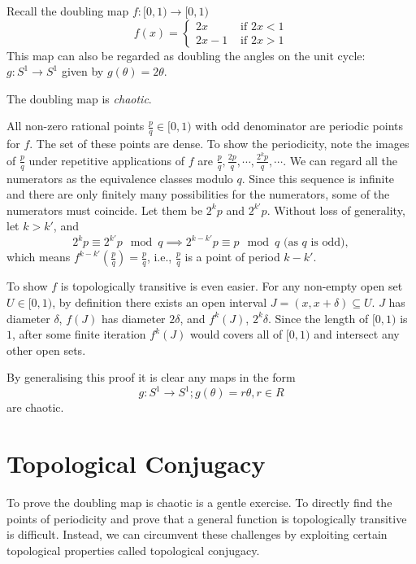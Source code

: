 \begin{example}\label{ex_doubling_map}
	Recall the doubling map $f: [0,1) \rightarrow [0,1)$
	\begin{equation}\label{eq:doubling_map}
	f(x) = 
		\begin{cases}
			2x &\text{ if } 2x < 1 \\
			2x -1 &\text{ if } 2x > 1
		\end{cases}
	\end{equation}
	This map can also be regarded as doubling the angles on the unit cycle: $g: S^1 \rightarrow S^1$ given by $ g(\theta) = 2 \theta$.
	
	The doubling map is \textit{chaotic}.

	All non-zero rational points $\frac{p}{q} \in [0,1)$ with odd denominator are periodic points for $f$. 
	The set of these points are dense.
	To show the periodicity, note the images of $\frac{p}{q}$ under repetitive applications of $f$ are $\frac{p}{q}, \frac{2p}{q}, \cdots, \frac{2^k p}{q}, \cdots$.
	We can regard all the numerators as the equivalence classes modulo $q$.
	Since this sequence is infinite and there are only finitely many possibilities for the numerators, some of the numerators must coincide. Let them be $2^k p$ and $2^{k'} p$. 
	Without loss of generality, let $k > k'$, and
	$$
	2^k p \equiv 2^{k'} p \mod q \implies 
	2^{k-k'} p \equiv p \mod q \text{ (as $q$ is odd)},
	$$
	which means $f^{k-k'}(\frac{p}{q}) = \frac{p}{q}$, i.e., $\frac{p}{q}$ is a point of period $k - k'$.

	To show $f$ is topologically transitive is even easier. 
	For any non-empty open set $U \in [0,1)$, by definition there exists an open interval $J = (x, x+ \delta) \subseteq U$. 
	$J$ has diameter $\delta$, $f(J)$ has diameter $2 \delta$, and $f^k(J)$, $2^k \delta$. 
	Since the length of $[0,1)$ is $1$, after some finite iteration $f^k(J)$ would covers all of $[0,1)$ and intersect any other open sets.

	By generalising this proof it is clear any maps in the form 
	$$
	g: S^1 \rightarrow S^1; g(\theta) = r \theta, r \in R
	$$
	are chaotic.
\end{example}

\section{Topological Conjugacy}

To prove the doubling map is chaotic is a gentle exercise. 
To directly find the points of periodicity and prove that a general function is topologically transitive is difficult.
Instead, we can circumvent these challenges by exploiting certain topological properties called topological conjugacy.

